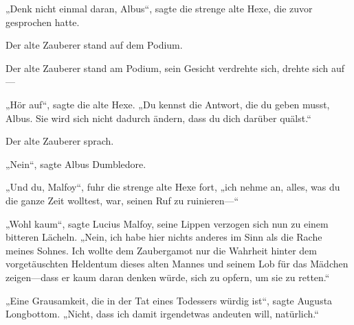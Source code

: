„Denk nicht einmal daran, Albus“, sagte die strenge alte Hexe, die zuvor gesprochen hatte.

Der alte Zauberer stand auf dem Podium.

Der alte Zauberer stand am Podium, sein Gesicht verdrehte sich, drehte sich auf—

„Hör auf“, sagte die alte Hexe. „Du kennst die Antwort, die du geben musst, Albus. Sie wird sich nicht dadurch ändern, dass du dich darüber quälst.“

Der alte Zauberer sprach.

„Nein“, sagte Albus Dumbledore.

„Und du, Malfoy“, fuhr die strenge alte Hexe fort, „ich nehme an, alles, was du die ganze Zeit wolltest, war, seinen Ruf zu ruinieren—“

„Wohl kaum“, sagte Lucius Malfoy, seine Lippen verzogen sich nun zu einem bitteren Lächeln.
„Nein, ich habe hier nichts anderes im Sinn als die Rache meines Sohnes. Ich wollte dem Zaubergamot nur die Wahrheit hinter dem vorgetäuschten Heldentum dieses alten Mannes und seinem Lob für das Mädchen zeigen—dass er kaum daran denken würde, sich zu opfern, um sie zu retten.“

„Eine Grausamkeit, die in der Tat eines Todessers würdig ist“, sagte Augusta Longbottom. „Nicht, dass ich damit irgendetwas andeuten will, natürlich.“

